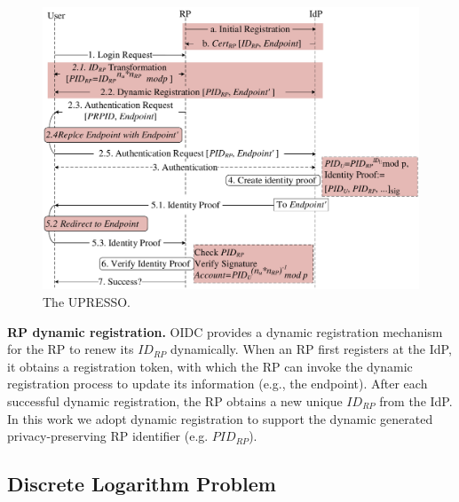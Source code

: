 \begin{figure}[t]
  \centering
  \includegraphics[width=\linewidth]{fig/overview1.pdf}
  \caption{The UPRESSO.}
  \label{fig:UPRESSO}
\end{figure}

\noindent\textbf{RP dynamic registration.} OIDC provides a dynamic registration mechanism~\cite{DynamicRegistration} for the RP to renew its $ID_{RP}$ dynamically. %
When an RP first registers at the IdP, it obtains a registration token, with which the  RP can invoke the dynamic registration process to
update its information (e.g., the endpoint). %
After each successful dynamic registration, the RP obtains a new unique $ID_{RP}$ from the IdP.
In this work we adopt dynamic registration to support the dynamic generated privacy-preserving RP identifier (e.g. $PID_{RP}$). 


\subsection{Discrete Logarithm Problem}
\label{sec:dlp}

